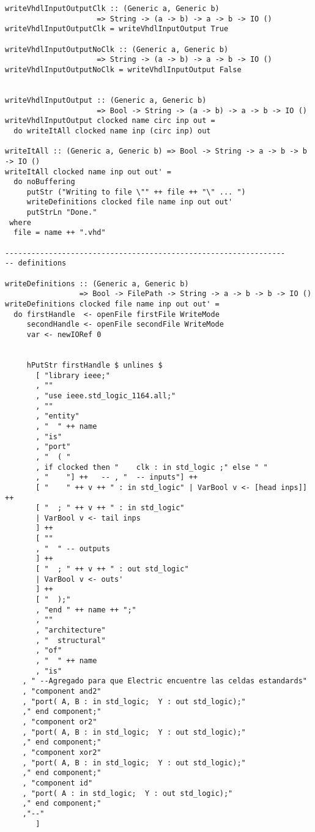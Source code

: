 \begin{lstlisting}
writeVhdlInputOutputClk :: (Generic a, Generic b)
                     => String -> (a -> b) -> a -> b -> IO ()
writeVhdlInputOutputClk = writeVhdlInputOutput True

writeVhdlInputOutputNoClk :: (Generic a, Generic b)
                     => String -> (a -> b) -> a -> b -> IO ()
writeVhdlInputOutputNoClk = writeVhdlInputOutput False


writeVhdlInputOutput :: (Generic a, Generic b)
                     => Bool -> String -> (a -> b) -> a -> b -> IO ()
writeVhdlInputOutput clocked name circ inp out =
  do writeItAll clocked name inp (circ inp) out

writeItAll :: (Generic a, Generic b) => Bool -> String -> a -> b -> b -> IO ()
writeItAll clocked name inp out out' =
  do noBuffering
     putStr ("Writing to file \"" ++ file ++ "\" ... ")
     writeDefinitions clocked file name inp out out'
     putStrLn "Done."
 where
  file = name ++ ".vhd"
  
----------------------------------------------------------------
-- definitions

writeDefinitions :: (Generic a, Generic b)
                 => Bool -> FilePath -> String -> a -> b -> b -> IO ()
writeDefinitions clocked file name inp out out' =
  do firstHandle  <- openFile firstFile WriteMode
     secondHandle <- openFile secondFile WriteMode
     var <- newIORef 0
     

     hPutStr firstHandle $ unlines $
       [ "library ieee;"
       , ""
       , "use ieee.std_logic_1164.all;"
       , ""
       , "entity"
       , "  " ++ name
       , "is"
       , "port"
       , "  ( "
       , if clocked then "    clk : in std_logic ;" else " "
       , "    "] ++   -- , "  -- inputs"] ++
       [ "    " ++ v ++ " : in std_logic" | VarBool v <- [head inps]] ++
       [ "  ; " ++ v ++ " : in std_logic"
       | VarBool v <- tail inps
       ] ++
       [ ""
       , "  " -- outputs
       ] ++
       [ "  ; " ++ v ++ " : out std_logic"
       | VarBool v <- outs'
       ] ++
       [ "  );"
       , "end " ++ name ++ ";"
       , ""
       , "architecture"
       , "  structural"
       , "of"
       , "  " ++ name
       , "is"
	, " --Agregado para que Electric encuentre las celdas estandards"
	, "component and2"
	, "port( A, B : in std_logic;  Y : out std_logic);"
	," end component;"
	, "component or2"
	, "port( A, B : in std_logic;  Y : out std_logic);"
	," end component;"
	, "component xor2"
	, "port( A, B : in std_logic;  Y : out std_logic);"
	," end component;"
	, "component id"
	, "port( A : in std_logic;  Y : out std_logic);"
	," end component;"
	,"--"
       ]


\end{lstlisting}

